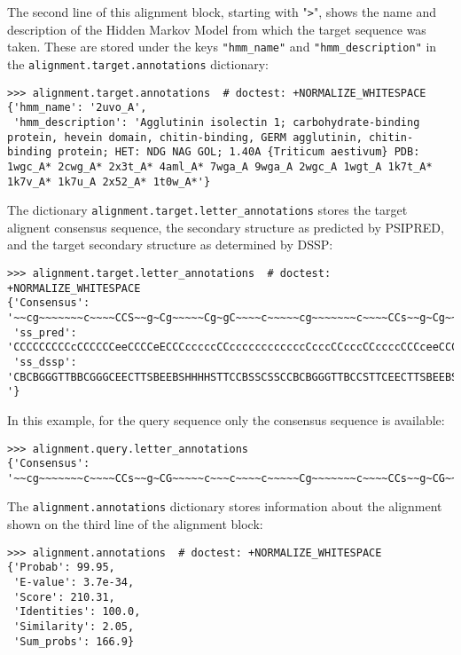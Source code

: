The second line of this alignment block, starting with "\verb|>|", shows the name and description of the Hidden Markov Model from which the target sequence was taken. These are stored under the keys \verb|"hmm_name"| and \verb|"hmm_description"| in the \verb|alignment.target.annotations| dictionary:
\begin{verbatim}
>>> alignment.target.annotations  # doctest: +NORMALIZE_WHITESPACE
{'hmm_name': '2uvo_A',
 'hmm_description': 'Agglutinin isolectin 1; carbohydrate-binding protein, hevein domain, chitin-binding, GERM agglutinin, chitin-binding protein; HET: NDG NAG GOL; 1.40A {Triticum aestivum} PDB: 1wgc_A* 2cwg_A* 2x3t_A* 4aml_A* 7wga_A 9wga_A 2wgc_A 1wgt_A 1k7t_A* 1k7v_A* 1k7u_A 2x52_A* 1t0w_A*'}
\end{verbatim}
The dictionary \verb|alignment.target.letter_annotations| stores the target alignent consensus sequence, the secondary structure as predicted by PSIPRED, and the target secondary structure as determined by DSSP:
\begin{verbatim}
>>> alignment.target.letter_annotations  # doctest: +NORMALIZE_WHITESPACE
{'Consensus': '~~cg~~~~~~~c~~~~CCS~~g~Cg~~~~~Cg~gC~~~~c~~~~~cg~~~~~~~c~~~~CCs~~g~Cg~~~~~c~~~c~~~~~~~~~~cg~~~~~~~c~~~~CCs~~g~CG~~~~~C~~gCq~~~c~~~~~cg~~~~~~~c~~~~ccs~~g~Cg~~~~~C~~~cq~~~~~~',
 'ss_pred': 'CCCCCCCCCcCCCCCCeeCCCCeECCCcccccCCccccccccccccCcccCCcccCCccccCCCceeCCCccccCCCcccccccccccccccccCCCCCCCcccCCCCccCCCcccccCCCcCCccccccccccccccccCCCCCCcCCCCEecCchhhcccccccCCCCC',
 'ss_dssp': 'CBCBGGGTTBBCGGGCEECTTSBEEBSHHHHSTTCCBSSCSSCCBCBGGGTTBCCSTTCEECTTSBEEBSHHHHSTTCCBSSCSSCCBCBGGGTTBCCGGGCEECTTSBEEBSHHHHSTTCCBSSCSSCCCCBTTTTTBCCSTTCEECTTSCEEBSHHHHSTTCCBSSCC '}
\end{verbatim}
In this example, for the query sequence only the consensus sequence is available:
\begin{verbatim}
>>> alignment.query.letter_annotations
{'Consensus': '~~cg~~~~~~~c~~~~CCs~~g~CG~~~~~c~~~c~~~~c~~~~~Cg~~~~~~~c~~~~CCs~~g~CG~~~~~c~~~c~~~~~~~~~~Cg~~~~~~~c~~~~CCS~~G~CG~~~~~C~~~Cq~~~c~~~~~Cg~~~~~~~c~~~~CCS~~G~CG~~~~~C~~gCq~~~c~~'}
\end{verbatim}
The \verb|alignment.annotations| dictionary stores information about the alignment shown on the third line of the alignment block:
\begin{verbatim}
>>> alignment.annotations  # doctest: +NORMALIZE_WHITESPACE
{'Probab': 99.95,
 'E-value': 3.7e-34,
 'Score': 210.31,
 'Identities': 100.0,
 'Similarity': 2.05,
 'Sum_probs': 166.9}
\end{verbatim}
